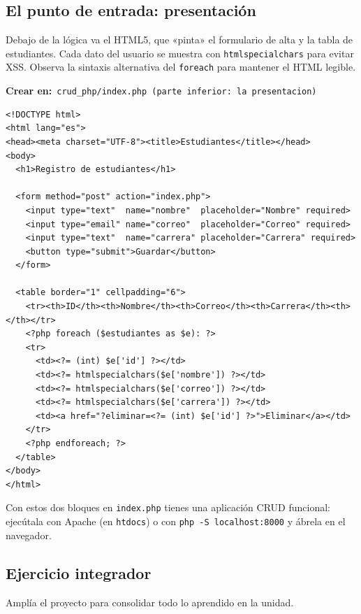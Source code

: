 \documentclass[11pt]{article}
\begin{document}
\subsection{El punto de entrada: presentación}
Debajo de la lógica va el HTML5, que «pinta» el formulario de alta y la tabla de estudiantes. Cada dato del usuario se muestra con \texttt{htmlspecialchars} para evitar XSS. Observa la sintaxis alternativa del \texttt{foreach} para mantener el HTML legible.

{\small\color{phpazulo}\textbf{Crear en:}~}\texttt{crud\_php/\allowbreak{}index.\allowbreak{}php  (parte inferior:\allowbreak{} la presentacion)}\par\nobreak\vspace{-1pt}
\begin{cajacodigo}
\begin{lstlisting}[style=php]
<!DOCTYPE html>
<html lang="es">
<head><meta charset="UTF-8"><title>Estudiantes</title></head>
<body>
  <h1>Registro de estudiantes</h1>

  <form method="post" action="index.php">
    <input type="text"  name="nombre"  placeholder="Nombre" required>
    <input type="email" name="correo"  placeholder="Correo" required>
    <input type="text"  name="carrera" placeholder="Carrera" required>
    <button type="submit">Guardar</button>
  </form>

  <table border="1" cellpadding="6">
    <tr><th>ID</th><th>Nombre</th><th>Correo</th><th>Carrera</th><th></th></tr>
    <?php foreach ($estudiantes as $e): ?>
    <tr>
      <td><?= (int) $e['id'] ?></td>
      <td><?= htmlspecialchars($e['nombre']) ?></td>
      <td><?= htmlspecialchars($e['correo']) ?></td>
      <td><?= htmlspecialchars($e['carrera']) ?></td>
      <td><a href="?eliminar=<?= (int) $e['id'] ?>">Eliminar</a></td>
    </tr>
    <?php endforeach; ?>
  </table>
</body>
</html>
\end{lstlisting}
\end{cajacodigo}
\vspace{2pt}
Con estos dos bloques en \texttt{index.\allowbreak{}php} tienes una aplicación CRUD funcional: ejecútala con Apache (en \texttt{htdocs}) o con \texttt{php -S localhost:\allowbreak{}8000} y ábrela en el navegador.

\subsection{Ejercicio integrador}
Amplía el proyecto para consolidar todo lo aprendido en la unidad.
\end{document}
